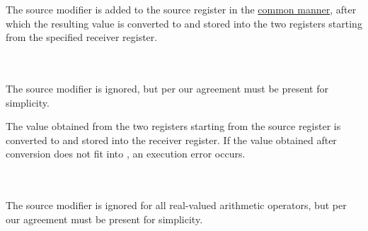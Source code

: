 The source modifier is added to the source register in
the \hyperlink{types:twos_complement}{common manner}, after which the resulting
 value is converted to  and stored into the two registers
starting from the specified receiver register.

\vspace{-0.35cm}

\paragraph{}\

The source modifier is ignored, but per our agreement must be present for simplicity.

The  value obtained from the two registers starting from the source
register is converted to  and stored into the receiver register.
If the value obtained after conversion does not fit into ,
an execution error occurs.

\vspace{-0.35cm}

\paragraph{}\

The source modifier is ignored for all real-valued arithmetic operators,
but per our agreement must be present for simplicity.
